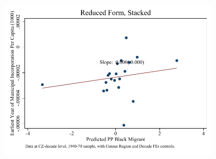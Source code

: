 \documentclass{article}
\begin{document}
\begin{figure}
\centering
\includegraphics{figures/simplefigs/stacked_cgoodman_pc_C3_full_rf.pdf}
\end{figure}
\clearpage
\end{document}
